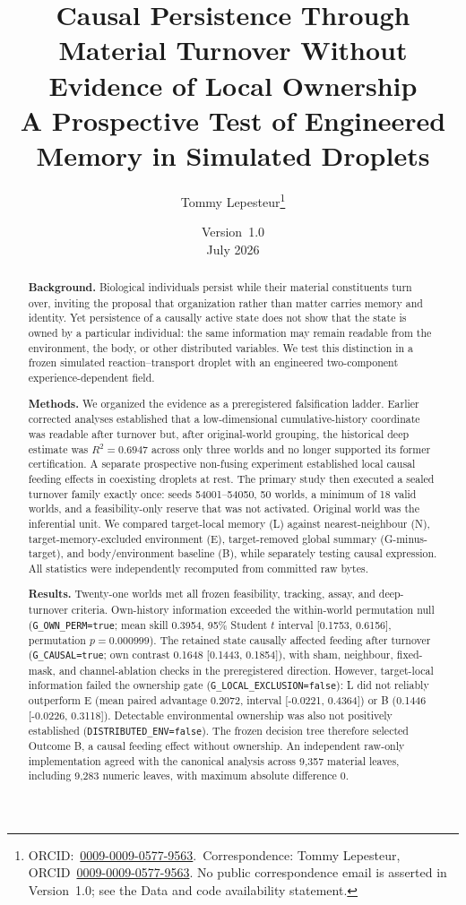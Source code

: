 \documentclass[11pt]{article}
\title{\textbf{Causal Persistence Through Material Turnover Without Evidence of Local Ownership}\\[0.35em]
\large\textnormal{A Prospective Test of Engineered Memory in Simulated Droplets}}
\author[1]{Tommy Lepesteur\thanks{ORCID:~\href{https://orcid.org/0009-0009-0577-9563}{0009-0009-0577-9563}.\ Correspondence: Tommy Lepesteur, ORCID~\href{https://orcid.org/0009-0009-0577-9563}{0009-0009-0577-9563}. No public correspondence email is asserted in Version~1.0; see the Data and code availability statement.}}
\affil[1]{Independent Researcher, Rennes, France}
\date{Version~1.0\\[2pt]July 2026}
\newcommand{\code}[1]{\texttt{#1}}
\begin{document}
\maketitle

\begin{abstract}
\noindent\textbf{Background.}
Biological individuals persist while their material constituents turn over, inviting the proposal that organization rather than matter carries memory and identity. Yet persistence of a causally active state does not show that the state is owned by a particular individual: the same information may remain readable from the environment, the body, or other distributed variables. We test this distinction in a frozen simulated reaction--transport droplet with an engineered two-component experience-dependent field.

\noindent\textbf{Methods.}
We organized the evidence as a preregistered falsification ladder. Earlier corrected analyses established that a low-dimensional cumulative-history coordinate was readable after turnover but, after original-world grouping, the historical deep estimate was $R^2=0.6947$ across only three worlds and no longer supported its former certification. A separate prospective non-fusing experiment established local causal feeding effects in coexisting droplets at rest. The primary study then executed a sealed turnover family exactly once: seeds 54001--54050, 50 worlds, a minimum of 18 valid worlds, and a feasibility-only reserve that was not activated. Original world was the inferential unit. We compared target-local memory (L) against nearest-neighbour (N), target-memory-excluded environment (E), target-removed global summary (G-minus-target), and body/environment baseline (B), while separately testing causal expression. All statistics were independently recomputed from committed raw bytes.

\noindent\textbf{Results.}
Twenty-one worlds met all frozen feasibility, tracking, assay, and deep-turnover criteria. Own-history information exceeded the within-world permutation null (\code{G\_OWN\_PERM=true}; mean skill 0.3954, 95\% Student $t$ interval [0.1753, 0.6156], permutation $p=0.000999$). The retained state causally affected feeding after turnover (\code{G\_CAUSAL=true}; own contrast 0.1648 [0.1443, 0.1854]), with sham, neighbour, fixed-mask, and channel-ablation checks in the preregistered direction. However, target-local information failed the ownership gate (\code{G\_LOCAL\_EXCLUSION=false}): L did not reliably outperform E (mean paired advantage 0.2072, interval [-0.0221, 0.4364]) or B (0.1446 [-0.0226, 0.3118]). Detectable environmental ownership was also not positively established (\code{DISTRIBUTED\_ENV=false}). The frozen decision tree therefore selected Outcome B, a causal feeding effect without ownership. An independent raw-only implementation agreed with the canonical analysis across 9,357 material leaves, including 9,283 numeric leaves, with maximum absolute difference 0.


\end{abstract}
\end{document}
